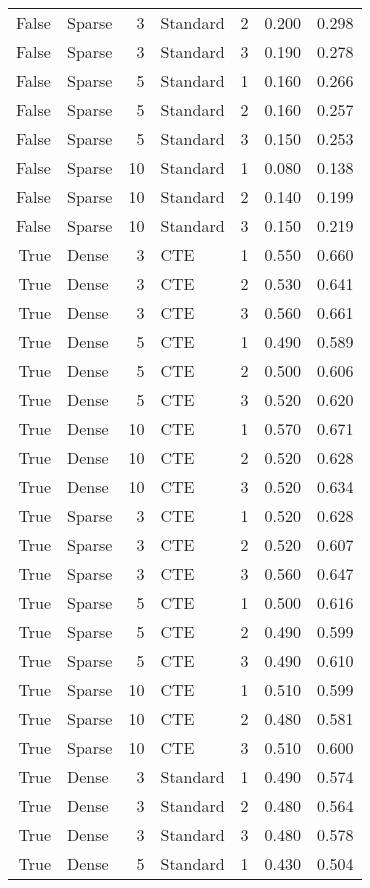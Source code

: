 \begin{tabular}{rlrlrrr}
False & Sparse & 3 & Standard & 2 & 0.200 & 0.298 \\
False & Sparse & 3 & Standard & 3 & 0.190 & 0.278 \\
False & Sparse & 5 & Standard & 1 & 0.160 & 0.266 \\
False & Sparse & 5 & Standard & 2 & 0.160 & 0.257 \\
False & Sparse & 5 & Standard & 3 & 0.150 & 0.253 \\
False & Sparse & 10 & Standard & 1 & 0.080 & 0.138 \\
False & Sparse & 10 & Standard & 2 & 0.140 & 0.199 \\
False & Sparse & 10 & Standard & 3 & 0.150 & 0.219 \\
True & Dense & 3 & CTE & 1 & 0.550 & 0.660 \\
True & Dense & 3 & CTE & 2 & 0.530 & 0.641 \\
True & Dense & 3 & CTE & 3 & 0.560 & 0.661 \\
True & Dense & 5 & CTE & 1 & 0.490 & 0.589 \\
True & Dense & 5 & CTE & 2 & 0.500 & 0.606 \\
True & Dense & 5 & CTE & 3 & 0.520 & 0.620 \\
True & Dense & 10 & CTE & 1 & 0.570 & 0.671 \\
True & Dense & 10 & CTE & 2 & 0.520 & 0.628 \\
True & Dense & 10 & CTE & 3 & 0.520 & 0.634 \\
True & Sparse & 3 & CTE & 1 & 0.520 & 0.628 \\
True & Sparse & 3 & CTE & 2 & 0.520 & 0.607 \\
True & Sparse & 3 & CTE & 3 & 0.560 & 0.647 \\
True & Sparse & 5 & CTE & 1 & 0.500 & 0.616 \\
True & Sparse & 5 & CTE & 2 & 0.490 & 0.599 \\
True & Sparse & 5 & CTE & 3 & 0.490 & 0.610 \\
True & Sparse & 10 & CTE & 1 & 0.510 & 0.599 \\
True & Sparse & 10 & CTE & 2 & 0.480 & 0.581 \\
True & Sparse & 10 & CTE & 3 & 0.510 & 0.600 \\
True & Dense & 3 & Standard & 1 & 0.490 & 0.574 \\
True & Dense & 3 & Standard & 2 & 0.480 & 0.564 \\
True & Dense & 3 & Standard & 3 & 0.480 & 0.578 \\
True & Dense & 5 & Standard & 1 & 0.430 & 0.504 \\

\end{tabular}
